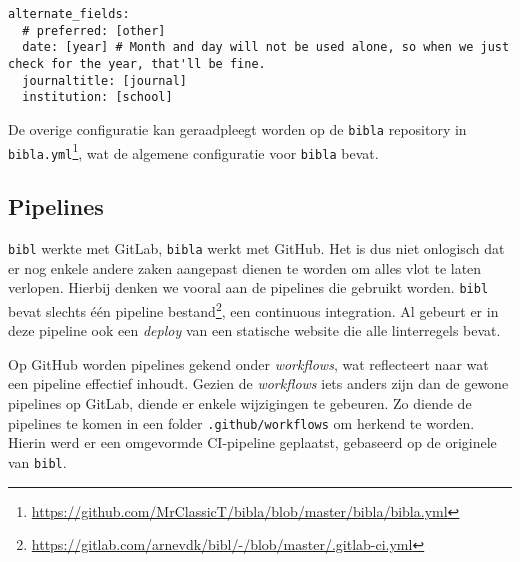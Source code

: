 \begin{verbatim}
alternate_fields:
  # preferred: [other]
  date: [year] # Month and day will not be used alone, so when we just check for the year, that'll be fine.
  journaltitle: [journal]
  institution: [school]
\end{verbatim}

De overige configuratie kan geraadpleegt worden op de \texttt{bibla} repository in \texttt{bibla.yml}\footnote{\url{https://github.com/MrClassicT/bibla/blob/master/bibla/bibla.yml}}, wat de algemene configuratie voor \texttt{bibla} bevat.

\subsection{Pipelines}
\texttt{bibl} werkte met GitLab, \texttt{bibla} werkt met GitHub. Het is dus niet onlogisch dat er nog enkele andere zaken aangepast dienen te worden om alles vlot te laten verlopen. Hierbij denken we vooral aan de pipelines die gebruikt worden. \texttt{bibl} bevat slechts één pipeline bestand\footnote{\url{https://gitlab.com/arnevdk/bibl/-/blob/master/.gitlab-ci.yml}}, een continuous integration. Al gebeurt er in deze pipeline ook een \emph{deploy} van een statische website die alle linterregels bevat.

Op GitHub worden pipelines gekend onder \emph{workflows}, wat reflecteert naar wat een pipeline effectief inhoudt. Gezien de \emph{workflows} iets anders zijn dan de gewone pipelines op GitLab, diende er enkele wijzigingen te gebeuren. Zo diende de pipelines te komen in een folder \texttt{.github/workflows} om herkend te worden. Hierin werd er een omgevormde CI-pipeline geplaatst, gebaseerd op de originele van \texttt{bibl}.

